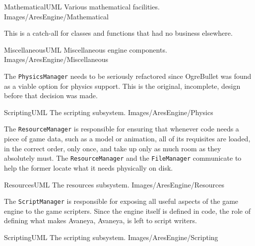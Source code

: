 \FullPageLandscapeDiagram
    {MathematicalUML}
    {Various mathematical facilities.}
    {Images/AresEngine/Mathematical}

\page 
{}
This is a catch-all for classes and functions that had no business elsewhere.

\FullPageLandscapeDiagram
    {MiscellaneousUML}
    {Miscellaneous engine components.}
    {Images/AresEngine/Miscellaneous}

\page 
{}
The {\tt PhysicsManager} needs to be seriously refactored since OgreBullet was found as a viable option for physics support. This is the original, incomplete, design before that decision was made.

\FullPageLandscapeDiagram
    {ScriptingUML}
    {The scripting subsystem.}
    {Images/AresEngine/Physics}

\page 
{}
The {\tt ResourceManager} is responsible for ensuring that whenever code needs a piece of game data, such as a model or animation, all of its requisites are loaded, in the correct order, only once, and take up only as much room as they absolutely must. The {\tt ResourceManager} and the {\tt FileManager} communicate to help the former locate what it needs physically on disk.

\FullPageLandscapeDiagram
    {ResourcesUML}
    {The resources subsystem.}
    {Images/AresEngine/Resources}

\page 
{}
The {\tt ScriptManager} is responsible for exposing all useful aspects of the game engine to the game scripters. Since the engine itself is defined in code, the role of defining what makes Avaneya, Avaneya, is left to script writers.

\FullPageLandscapeDiagram
    {ScriptingUML}
    {The scripting subsystem.}
    {Images/AresEngine/Scripting}


